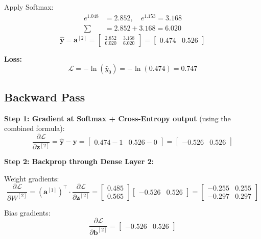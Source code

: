 \documentclass[12pt, a4paper]{report}
\theoremstyle{definition}
\begin{document}
Apply Softmax:
\begin{align*}
e^{1.048} &= 2.852, \quad e^{1.153} = 3.168 \\
\sum &= 2.852 + 3.168 = 6.020
\end{align*}
\[
\hat{\mathbf{y}} = \mathbf{a}^{[2]} = \begin{bmatrix} \frac{2.852}{6.020} & \frac{3.168}{6.020} \end{bmatrix} = \begin{bmatrix} 0.474 & 0.526 \end{bmatrix}
\]

\textbf{Loss:}
\[
\mathcal{L} = -\ln(\hat{y}_0) = -\ln(0.474) = \boxed{0.747}
\]

\subsection{Backward Pass}

\textbf{Step 1: Gradient at Softmax + Cross-Entropy output} (using the combined formula):
\[
\frac{\partial \mathcal{L}}{\partial \mathbf{z}^{[2]}} = \hat{\mathbf{y}} - \mathbf{y} = \begin{bmatrix} 0.474 - 1 & 0.526 - 0 \end{bmatrix} = \begin{bmatrix} -0.526 & 0.526 \end{bmatrix}
\]

\textbf{Step 2: Backprop through Dense Layer 2:}

Weight gradients:
\[
\frac{\partial \mathcal{L}}{\partial W^{[2]}} = (\mathbf{a}^{[1]})^\top \cdot \frac{\partial \mathcal{L}}{\partial \mathbf{z}^{[2]}} = \begin{bmatrix} 0.485 \\ 0.565 \end{bmatrix} \begin{bmatrix} -0.526 & 0.526 \end{bmatrix} = \begin{bmatrix} -0.255 & 0.255 \\ -0.297 & 0.297 \end{bmatrix}
\]

Bias gradients:
\[
\frac{\partial \mathcal{L}}{\partial \mathbf{b}^{[2]}} = \begin{bmatrix} -0.526 & 0.526 \end{bmatrix}
\]
\end{document}
